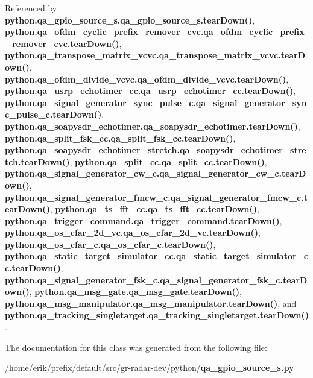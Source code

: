 Referenced by {\bf python.\+qa\+\_\+gpio\+\_\+source\+\_\+s.\+qa\+\_\+gpio\+\_\+source\+\_\+s.\+tear\+Down()}, {\bf python.\+qa\+\_\+ofdm\+\_\+cyclic\+\_\+prefix\+\_\+remover\+\_\+cvc.\+qa\+\_\+ofdm\+\_\+cyclic\+\_\+prefix\+\_\+remover\+\_\+cvc.\+tear\+Down()}, {\bf python.\+qa\+\_\+transpose\+\_\+matrix\+\_\+vcvc.\+qa\+\_\+transpose\+\_\+matrix\+\_\+vcvc.\+tear\+Down()}, {\bf python.\+qa\+\_\+ofdm\+\_\+divide\+\_\+vcvc.\+qa\+\_\+ofdm\+\_\+divide\+\_\+vcvc.\+tear\+Down()}, {\bf python.\+qa\+\_\+usrp\+\_\+echotimer\+\_\+cc.\+qa\+\_\+usrp\+\_\+echotimer\+\_\+cc.\+tear\+Down()}, {\bf python.\+qa\+\_\+signal\+\_\+generator\+\_\+sync\+\_\+pulse\+\_\+c.\+qa\+\_\+signal\+\_\+generator\+\_\+sync\+\_\+pulse\+\_\+c.\+tear\+Down()}, {\bf python.\+qa\+\_\+soapysdr\+\_\+echotimer.\+qa\+\_\+soapysdr\+\_\+echotimer.\+tear\+Down()}, {\bf python.\+qa\+\_\+split\+\_\+fsk\+\_\+cc.\+qa\+\_\+split\+\_\+fsk\+\_\+cc.\+tear\+Down()}, {\bf python.\+qa\+\_\+soapysdr\+\_\+echotimer\+\_\+stretch.\+qa\+\_\+soapysdr\+\_\+echotimer\+\_\+stretch.\+tear\+Down()}, {\bf python.\+qa\+\_\+split\+\_\+cc.\+qa\+\_\+split\+\_\+cc.\+tear\+Down()}, {\bf python.\+qa\+\_\+signal\+\_\+generator\+\_\+cw\+\_\+c.\+qa\+\_\+signal\+\_\+generator\+\_\+cw\+\_\+c.\+tear\+Down()}, {\bf python.\+qa\+\_\+signal\+\_\+generator\+\_\+fmcw\+\_\+c.\+qa\+\_\+signal\+\_\+generator\+\_\+fmcw\+\_\+c.\+tear\+Down()}, {\bf python.\+qa\+\_\+ts\+\_\+fft\+\_\+cc.\+qa\+\_\+ts\+\_\+fft\+\_\+cc.\+tear\+Down()}, {\bf python.\+qa\+\_\+trigger\+\_\+command.\+qa\+\_\+trigger\+\_\+command.\+tear\+Down()}, {\bf python.\+qa\+\_\+os\+\_\+cfar\+\_\+2d\+\_\+vc.\+qa\+\_\+os\+\_\+cfar\+\_\+2d\+\_\+vc.\+tear\+Down()}, {\bf python.\+qa\+\_\+os\+\_\+cfar\+\_\+c.\+qa\+\_\+os\+\_\+cfar\+\_\+c.\+tear\+Down()}, {\bf python.\+qa\+\_\+static\+\_\+target\+\_\+simulator\+\_\+cc.\+qa\+\_\+static\+\_\+target\+\_\+simulator\+\_\+cc.\+tear\+Down()}, {\bf python.\+qa\+\_\+signal\+\_\+generator\+\_\+fsk\+\_\+c.\+qa\+\_\+signal\+\_\+generator\+\_\+fsk\+\_\+c.\+tear\+Down()}, {\bf python.\+qa\+\_\+msg\+\_\+gate.\+qa\+\_\+msg\+\_\+gate.\+tear\+Down()}, {\bf python.\+qa\+\_\+msg\+\_\+manipulator.\+qa\+\_\+msg\+\_\+manipulator.\+tear\+Down()}, and {\bf python.\+qa\+\_\+tracking\+\_\+singletarget.\+qa\+\_\+tracking\+\_\+singletarget.\+tear\+Down()}.



The documentation for this class was generated from the following file\+:\begin{DoxyCompactItemize}
\item 
/home/erik/prefix/default/src/gr-\/radar-\/dev/python/{\bf qa\+\_\+gpio\+\_\+source\+\_\+s.\+py}\end{DoxyCompactItemize}
